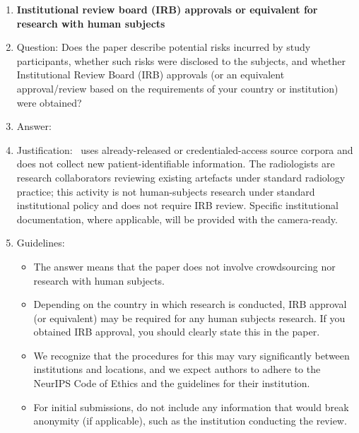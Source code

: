 \begin{enumerate}
\item {\bf Institutional review board (IRB) approvals or equivalent for research with human subjects}
    \item[] Question: Does the paper describe potential risks incurred by study participants, whether such risks were disclosed to the subjects, and whether Institutional Review Board (IRB) approvals (or an equivalent approval/review based on the requirements of your country or institution) were obtained?
    \item[] Answer: \answerNA{}
    \item[] Justification: \medvigil\ uses already-released or credentialed-access source corpora and does not collect new patient-identifiable information. The radiologists are research collaborators reviewing existing artefacts under standard radiology practice; this activity is not human-subjects research under standard institutional policy and does not require IRB review. Specific institutional documentation, where applicable, will be provided with the camera-ready.
    \item[] Guidelines:
    \begin{itemize}
        \item The answer \answerNA{} means that the paper does not involve crowdsourcing nor research with human subjects.
        \item Depending on the country in which research is conducted, IRB approval (or equivalent) may be required for any human subjects research. If you obtained IRB approval, you should clearly state this in the paper.
        \item We recognize that the procedures for this may vary significantly between institutions and locations, and we expect authors to adhere to the NeurIPS Code of Ethics and the guidelines for their institution.
        \item For initial submissions, do not include any information that would break anonymity (if applicable), such as the institution conducting the review.
    \end{itemize}


\end{enumerate}
